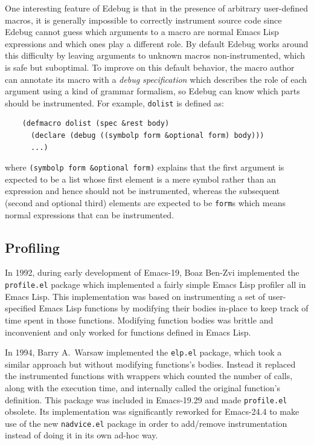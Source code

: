 \documentclass[format=acmsmall, review]{acmart}
\newcommand \Elisp {Emacs Lisp}
\begin{document}
One interesting feature of Edebug is that in the presence of arbitrary
user-defined macros, it is generally impossible to correctly instrument
source code since Edebug cannot guess which arguments to a macro are normal
\Elisp{} expressions and which ones play a different role.  By default
Edebug works around this difficulty by leaving arguments to unknown macros
non-instrumented, which is safe but suboptimal.  To improve on this default
behavior, the macro author can annotate its macro with a \emph{debug
  specification} which describes the role of each argument using a kind of
grammar formalism, so Edebug can know which parts should be
instrumented.  For example, \texttt{dolist} is defined as:
\begin{verbatim}
    (defmacro dolist (spec &rest body)
      (declare (debug ((symbolp form &optional form) body)))
      ...)
\end{verbatim}
where \texttt{(symbolp form \&optional form)} explains that the first
argument is expected to be a list whose first element is a mere symbol
rather than an expression and hence should not be instrumented, whereas the
subsequent (second and optional third) elements are expected to be
\texttt{form}s which means normal expressions that can be instrumented.

\subsection{Profiling}
\label{sec:profiler}

In 1992, during early development of Emacs-19, Boaz Ben-Zvi implemented the
\texttt{profile.el} package which implemented a fairly simple \Elisp{}
profiler all in \Elisp{}.  This implementation was based on instrumenting
a set of user-specified \Elisp{} functions by modifying their bodies in-place
to keep track of time spent in those functions. Modifying function
bodies was brittle and inconvenient and only worked for functions
defined in \Elisp.

In 1994, Barry A.~Warsaw implemented the \texttt{elp.el} package, which took
a similar approach but without modifying functions's bodies.
Instead it replaced the instrumented functions with wrappers which counted
the number of calls, along with the execution time, and internally called
the original function's definition.  This package was included in
Emacs-19.29 and made \texttt{profile.el} obsolete.  Its implementation was
significantly reworked for Emacs-24.4 to make use of the new
\texttt{nadvice.el} package in order to add/remove instrumentation instead
of doing it in its own ad-hoc way.
\end{document}
